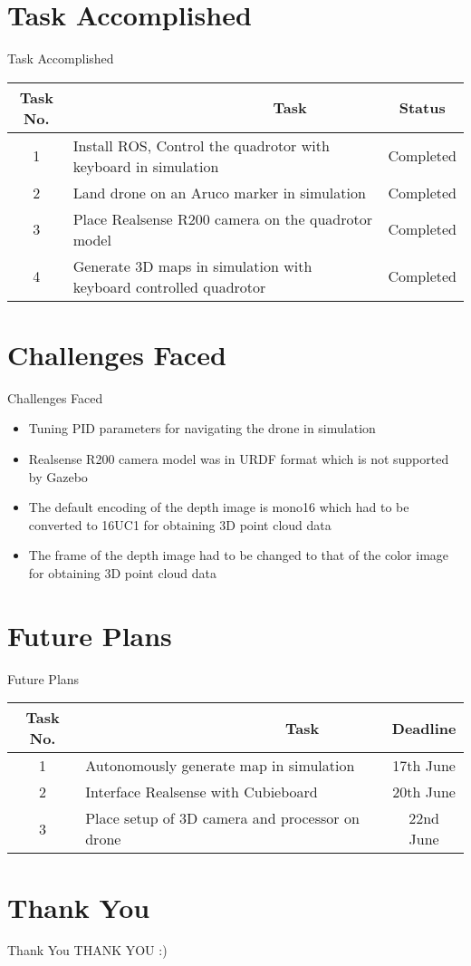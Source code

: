 \documentclass[10pt, a4paper]{beamer}
\begin{document}
\section{Task Accomplished}
\begin{frame}{Task Accomplished}
\begin{tabular}{| c | p{6.5cm} | c | }
\hline
Task No. & ~~~~~~~~~~~~~~~~~~~~~~~~Task & Status\\
\hline
  1 & Install ROS, Control the quadrotor with keyboard in simulation & Completed\\
\hline
2 & Land drone on an Aruco marker in simulation & Completed\\
\hline
3 & Place Realsense R200 camera on the quadrotor model & Completed\\
\hline
4 & Generate 3D maps in simulation with keyboard controlled quadrotor & Completed\\
\hline
\end{tabular}
\end{frame}

\section{Challenges Faced}
\begin{frame}{Challenges Faced}
	\begin{itemize}
		\item Tuning PID parameters for navigating the drone in simulation
		\item Realsense R200 camera model was in URDF format which is not supported by Gazebo
		\item The default encoding of the depth image is mono16 which had to be converted to 16UC1 for obtaining 3D point cloud data
		\item The frame of the depth image had to be changed to that of the color image for obtaining 3D point cloud data
	\end{itemize}
\end{frame}

\section{Future Plans}
\begin{frame}{Future Plans}
\begin{tabular}{| c | p{6.5cm} | c | }
\hline
Task No. & ~~~~~~~~~~~~~~~~~~~~~~~~Task & Deadline\\
\hline
1 & Autonomously generate map in simulation & 17th June\\
\hline
2 & Interface Realsense with Cubieboard & 20th June\\
\hline
3 & Place setup of 3D camera and processor on drone & 22nd June\\
\hline
\end{tabular}
\end{frame}


\section{Thank You}
\begin{frame}{Thank You}
	\centering THANK YOU :)
\end{frame}
\end{document}
